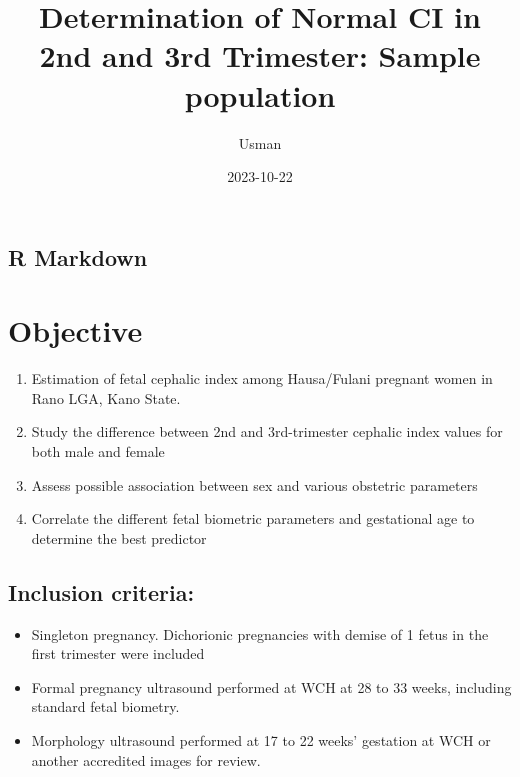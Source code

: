 \documentclass[
]{article}
\title{Determination of Normal CI in 2nd and 3rd Trimester: Sample
population}
\author{Usman}
\date{2023-10-22}
\providecommand{\tightlist}{%
  \setlength{\itemsep}{0pt}\setlength{\parskip}{0pt}}
\begin{document}
\maketitle

{
\setcounter{tocdepth}{2}
\tableofcontents
}
\hypertarget{r-markdown}{%
\subsection{\texorpdfstring{\textbf{R
Markdown}}{R Markdown}}\label{r-markdown}}

\hypertarget{objective}{%
\section{\texorpdfstring{\textbf{Objective}}{Objective}}\label{objective}}

\begin{enumerate}
\def\labelenumi{\arabic{enumi}.}
\tightlist
\item
  Estimation of fetal cephalic index among Hausa/Fulani pregnant women
  in Rano LGA, Kano State.
\item
  Study the difference between 2nd and 3rd-trimester cephalic index
  values for both male and female
\item
  Assess possible association between sex and various obstetric
  parameters
\item
  Correlate the different fetal biometric parameters and gestational age
  to determine the best predictor
\end{enumerate}

\hypertarget{inclusion-criteria}{%
\subsection{\texorpdfstring{\textbf{Inclusion
criteria}:}{Inclusion criteria:}}\label{inclusion-criteria}}

\begin{itemize}
\tightlist
\item
  Singleton pregnancy. Dichorionic pregnancies with demise of 1 fetus in
  the first trimester were included
\item
  Formal pregnancy ultrasound performed at WCH at 28 to 33 weeks,
  including standard fetal biometry.
\item
  Morphology ultrasound performed at 17 to 22 weeks' gestation at WCH or
  another accredited images for review.
\end{itemize}
\end{document}
